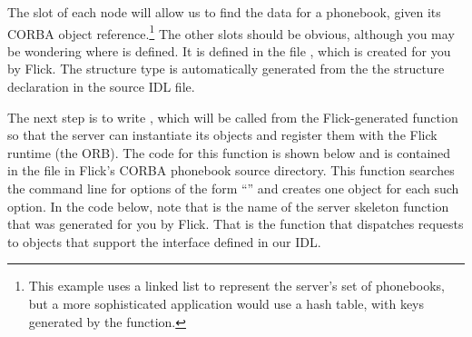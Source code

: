 The  slot of each node will allow us to find the
data for a phonebook, given its CORBA object reference.\footnote{This example
uses a linked list to represent the server's set of phonebooks, but a more
sophisticated application would use a hash table, with keys generated by the
 function.}  The other slots should be obvious,
although you may be wondering where  is defined.  It is
defined in the file , which is created for you by
Flick.  The  structure type is automatically generated from
the the  structure declaration in the source IDL file.

The next step is to write , which will be called
from the Flick-generated  function so that the server can
instantiate its objects and register them with the Flick runtime (the ORB).
The code for this function is shown below and is contained in the
 file in Flick's CORBA phonebook source directory.
This  function searches the command line for
options of the form ``'' and creates one object for
each such option.  In the code below, note that
 is the name of the server skeleton function
that was generated for you by Flick.  That is the function that dispatches
requests to objects that support the  interface defined in our
IDL\@.

